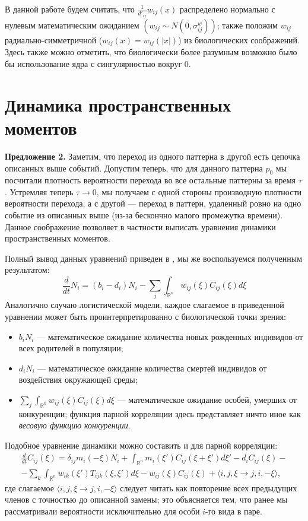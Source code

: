 В данной работе будем считать, что $ \frac{1}{d'_{ij}}w_{ij}(x) $ распределено нормально с нулевым математическим ожиданием $ \left(w_{ij}\sim N(0,\sigma_{ij}^{w})\right) $; также положим $ w_{ij} $ радиально-симметричной ($ w_{ij}(x)=w_{ij}(|x|) $) из биологических соображений. Здесь также можно отметить, что биологически более разумным возможно было бы использование ядра с сингулярностью вокруг 0.

\section{Динамика пространственных моментов}

\textbf{Предложение 2. } Заметим, что переход из одного паттерна в другой есть цепочка описанных выше событий. Допустим теперь, что для данного паттерна $p_0$ мы посчитали плотность вероятности перехода во все остальные паттерны за время $\tau$. Устремляя теперь $\tau \to 0$, мы получаем с одной стороны производную плотности вероятности перехода, а с другой --- переход в паттерн, удаленный ровно на одно событие из описанных выше (из-за бескончно малого промежутка времени). Данное соображение позволяет в частности выписать уравнения динамики пространственных моментов.

Полный вывод данных уравнений приведен в \cite{law_dieckmann_2000}, мы же воспользуемся полученным результатом:
\begin{equation*}
\frac{d}{dt}N_{i}=(b_{i}-d_{i})N_{i}-\sum_{j}\int_{\mathbb{R}^{n}}w_{ij}(\xi)C_{ij}(\xi)d\xi
\end{equation*}
Аналогично случаю логистической модели, каждое слагаемое в приведенной уравнении может быть проинтерпретированно с биологической точки зрения:
\begin{itemize}
\item $ b_{i}N_{i} $ --- математическое ожидание количества новых рожденных индивидов от всех родителей в популяции;

\item $ d_{i}N_{i} $ --- математическое ожидание количества смертей индивидов от воздействия окружающей среды;

\item $ \sum_{j}\int_{\mathbb{R}^{n}}w_{ij}(\xi)C_{ij}(\xi)d\xi $ --- математическое ожидание особей, умерших от конкуренции; функция парной корреляции здесь представляет ничто иное как \textit{весовую функцию конкуренции}.
\end{itemize}

Подобное уравнение динамики можно составить и для парной корреляции:
\begin{multline*}
\frac{d}{dt}C_{ij}(\xi)	=	\delta_{ij}m_{i}(-\xi)N_{i}+\int_{\mathbb{\mathbb{R}}^{n}}m_{i}(\xi')C_{ij}(\xi+\xi')d\xi'-d_{i}C_{ij}(\xi)-\\
-\sum_{k}\int_{\mathbb{\mathbb{R}}^{n}}w_{ik}(\xi')T_{ijk}(\xi,\xi')d\xi-w_{ij}(\xi)C_{ij}(\xi)+\langle i,j,\xi\to j,i,-\xi\rangle,
\end{multline*}
где слагаемое $ \langle i,j,\xi\to j,i,-\xi\rangle $ следует читать как повторение всех предыдущих членов с точностью до описанной замены; это объясняется тем, что ранее  мы рассматривали вероятности исключительно для особи $i$-го вида в паре.

